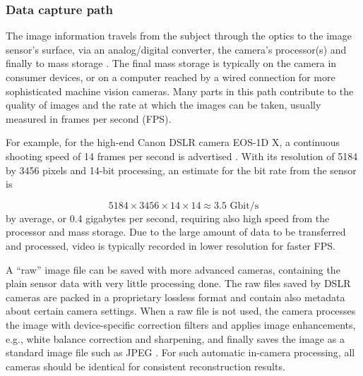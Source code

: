 
\subsubsection{Data capture path} %

The image information travels from the subject through the optics to the image sensor's surface, via an analog/digital converter, the camera's processor(s) and finally to mass storage \cite{szeliski10vision}.
The final mass storage is typically on the camera in consumer devices, or on a computer reached by a wired connection for more sophisticated machine vision cameras.
Many parts in this path contribute to the quality of images and the rate at which the images can be taken, usually measured in frames per second (FPS).



For example, for the high-end Canon DSLR camera EOS-1D X, a continuous shooting speed of 14 frames per second is advertised \cite{eos1dx}.
With its resolution of 5184 by 3456 pixels and 14-bit processing, an estimate for the bit rate from the sensor is

\begin{equation} \label{eq:eos1dspeed}
5184 \times 3456 \times 14 \times 14 \approx 3.5\text{ Gbit/s}
\end{equation}
by average, or 0.4 gigabytes per second, requiring also high speed from the processor and mass storage.
Due to the large amount of data to be transferred and processed, video is typically recorded in lower resolution for faster FPS.


A ``raw'' image file can be saved with more advanced cameras, containing the plain sensor data with very little processing done.
The raw files saved by DSLR cameras are packed in a proprietary lossless format and contain also metadata about certain camera settings.
When a raw file is not used, the camera processes the image with device-specific correction filters and applies image enhancements, e.g., white balance correction and sharpening, and finally saves the image as a standard image file such as JPEG \cite[p. 412]{szeliski10vision}.
For such automatic in-camera processing, all cameras should be identical for consistent reconstruction results.

